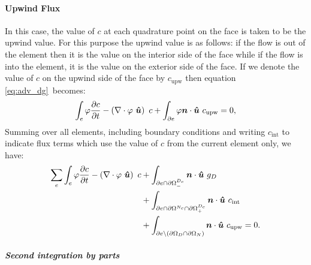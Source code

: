 \paragraph{Upwind Flux}

In this case, the value of $c$ at each quadrature point on the face is taken
to be the upwind value. For this purpose the upwind value is as follows: if
the flow is out of the element then it is the value on the interior side of
the face while if the flow is into the element, it is the value on the
exterior side of the face. If we denote the value of $c$ on the upwind side
of the face by $c_{\mathrm{upw}}$ then equation \eqref{eq:adv_dg}\ becomes:
\begin{equation}\label{eq:adv_dg}
  \int_e \varphi \frac{\partial c}{\partial t} -
    \left(\nabla\cdot \varphi~{\mbox{\boldmath$\hat u$}}\right)~c +
    \int_{\partial e} \varphi{\mbox{\boldmath$n$}}\cdot{\mbox{\boldmath$\hat u$}}~c_{\mathrm{upw}} 
    = 0,
\end{equation}
Summing over all elements, including boundary conditions and writing
$c_\mathrm{int}$ to indicate flux terms which use the value of $c$ from the
current element only, we have:
\begin{equation}
  \begin{split}
    \sum_e \int_e \varphi \frac{\partial c}{\partial t}
    - \left(\nabla\cdot \varphi~{\mbox{\boldmath$\hat u$}}\right)~c 
    &+ \int_{\partial e \cap\partial\Omega^{D_c}_-} {\mbox{\boldmath$n$}}\cdot{\mbox{\boldmath$\hat u$}}~g_D \\
    &+ \int_{\partial e \cap\partial\Omega^{N_c}\cap\partial\Omega^{D_c}_+} {\mbox{\boldmath$n$}}\cdot{\mbox{\boldmath$\hat u$}}~c_{\mathrm{int}} \\
    &+ \int_{\partial e\setminus (\partial\Omega_D\cap\partial\Omega_N)}
    {\mbox{\boldmath$n$}}\cdot{\mbox{\boldmath$\hat u$}}~c_{\mathrm{upw}}=0.
    \label{eq:dg_adv_diff_integrated_once}
  \end{split}
\end{equation}

\subparagraph{Second integration by parts}

